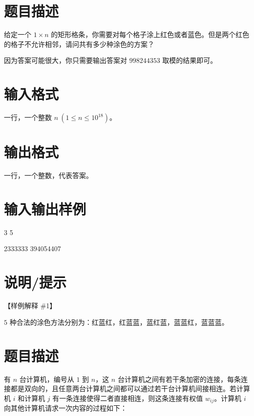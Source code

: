 \documentclass{ctpro}
\begin{document}
\makeproblem
\section*{题目描述}

给定一个 $1 \times n$ 的矩形格条，你需要对每个格子涂上红色或者蓝色。但是两个红色的格子不允许相邻，请问共有多少种涂色的方案？

因为答案可能很大，你只需要输出答案对 $998244353$ 取模的结果即可。

\section*{输入格式}

一行，一个整数 $n~(1 \leq n \leq {10}^{18})$。

\section*{输出格式}

一行，一个整数，代表答案。

\section*{输入输出样例}

\testcasetab
{
    3
}
{
    5
}

\testcasetab
{
    2333333
}
{
    394054407
}

\section*{说明/提示}

【样例解释 \#1】

$5$ 种合法的涂色方法分别为：红蓝红，红蓝蓝，蓝红蓝，蓝蓝红，蓝蓝蓝。

\makeproblem
\section*{题目描述}

有 $n$ 台计算机，编号从 $1$ 到 $n$，这 $n$ 台计算机之间有若干条加密的连接，每条连接都是双向的，且任意两台计算机之间都可以通过若干台计算机间接相连。若计算机 $i$ 和计算机 $j$ 有一条连接使得二者直接相连，则这条连接有权值 $w_{ij}$。计算机 $i$ 向其他计算机请求一次内容的过程如下：
\end{document}
